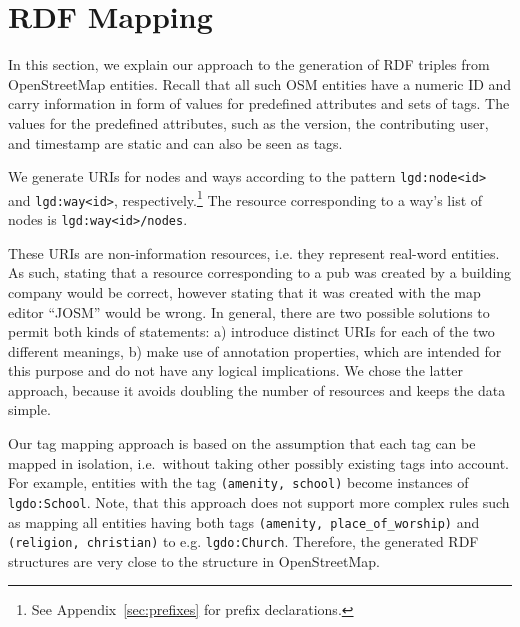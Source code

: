 
\section{RDF Mapping}
\label{sec:rdf_mapping}

In this section, we explain our approach to the generation of RDF triples from OpenStreetMap entities. 
Recall that all such OSM entities have a numeric ID and carry
information in form of values for predefined attributes and sets of tags.
The values for the predefined attributes, such as the version, the contributing
user, and timestamp are static and can also be seen as tags.

We generate URIs for nodes and ways according to the pattern
\verb=lgd:node<id>= and \verb=lgd:way<id>=, respectively.\footnote{See Appendix~\ref{sec:prefixes} for prefix declarations.} The resource
corresponding to a way's list of nodes is \verb=lgd:way<id>/nodes=.

These URIs are non-information resources, i.e. they represent
real-word entities. As such, stating that a resource corresponding to a pub
was created by a building company would be correct, however stating that it was
created with the map editor ``JOSM'' would be wrong.
In general, there are two possible solutions to permit both kinds of
statements: a) introduce distinct URIs for each of the two different
meanings, b) make use of annotation properties, which are intended for this purpose and do not have any logical implications. 
We chose the latter approach, because it avoids doubling the number of resources and keeps the data simple.

Our tag mapping approach is based on the assumption that each tag can be mapped in isolation, i.e.~without taking other possibly existing tags into account.
For example, entities with the tag \texttt{(amenity, school)} become instances of \texttt{lgdo:School}. 
Note, that this approach does not support more complex rules such as mapping all entities having both tags \texttt{(amenity, place\_of\_worship)} and \texttt{(religion, christian)} to e.g. \texttt{lgdo:Church}.
Therefore, the generated RDF structures are very close to the structure in OpenStreetMap.

